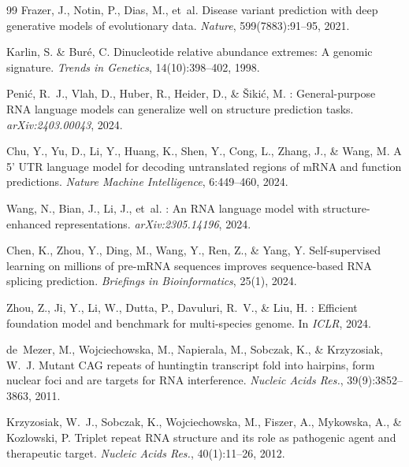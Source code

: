 \documentclass[11pt]{article}
\begin{document}
\begin{thebibliography}{99}
Frazer, J., Notin, P., Dias, M., et~al.
\newblock Disease variant prediction with deep generative models
  of evolutionary data.
\newblock \emph{Nature}, 599(7883):91--95, 2021.

Karlin, S. \& Bur\'{e}, C.
\newblock Dinucleotide relative abundance extremes: A genomic
  signature.
\newblock \emph{Trends in Genetics}, 14(10):398--402, 1998.

Peni\'{c}, R.~J., Vlah, D., Huber, R., Heider, D., \&
  \v{S}iki\'{c}, M.
: General-purpose {RNA} language models can
  generalize well on structure prediction tasks.
\newblock \emph{arXiv:2403.00043}, 2024.

Chu, Y., Yu, D., Li, Y., Huang, K., Shen, Y., Cong, L.,
  Zhang, J., \& Wang, M.
\newblock A 5' {UTR} language model for decoding untranslated
  regions of {mRNA} and function predictions.
\newblock \emph{Nature Machine Intelligence}, 6:449--460, 2024.

Wang, N., Bian, J., Li, J., et~al.
: An {RNA} language model with structure-enhanced
  representations.
\newblock \emph{arXiv:2305.14196}, 2024.

Chen, K., Zhou, Y., Ding, M., Wang, Y., Ren, Z., \& Yang, Y.
\newblock Self-supervised learning on millions of pre-{mRNA} sequences
  improves sequence-based {RNA} splicing prediction.
\newblock \emph{Briefings in Bioinformatics}, 25(1), 2024.

Zhou, Z., Ji, Y., Li, W., Dutta, P., Davuluri, R.~V., \& Liu, H.
: Efficient foundation model and benchmark for
  multi-species genome.
\newblock In \emph{ICLR}, 2024.

de~Mezer, M., Wojciechowska, M., Napierala, M., Sobczak, K., \&
  Krzyzosiak, W.~J.
\newblock Mutant {CAG} repeats of huntingtin transcript fold into
  hairpins, form nuclear foci and are targets for {RNA} interference.
\newblock \emph{Nucleic Acids Res.}, 39(9):3852--3863, 2011.

Krzyzosiak, W.~J., Sobczak, K., Wojciechowska, M., Fiszer, A.,
  Mykowska, A., \& Kozlowski, P.
\newblock Triplet repeat {RNA} structure and its role as pathogenic
  agent and therapeutic target.
\newblock \emph{Nucleic Acids Res.}, 40(1):11--26, 2012.


\end{thebibliography}
\end{document}
